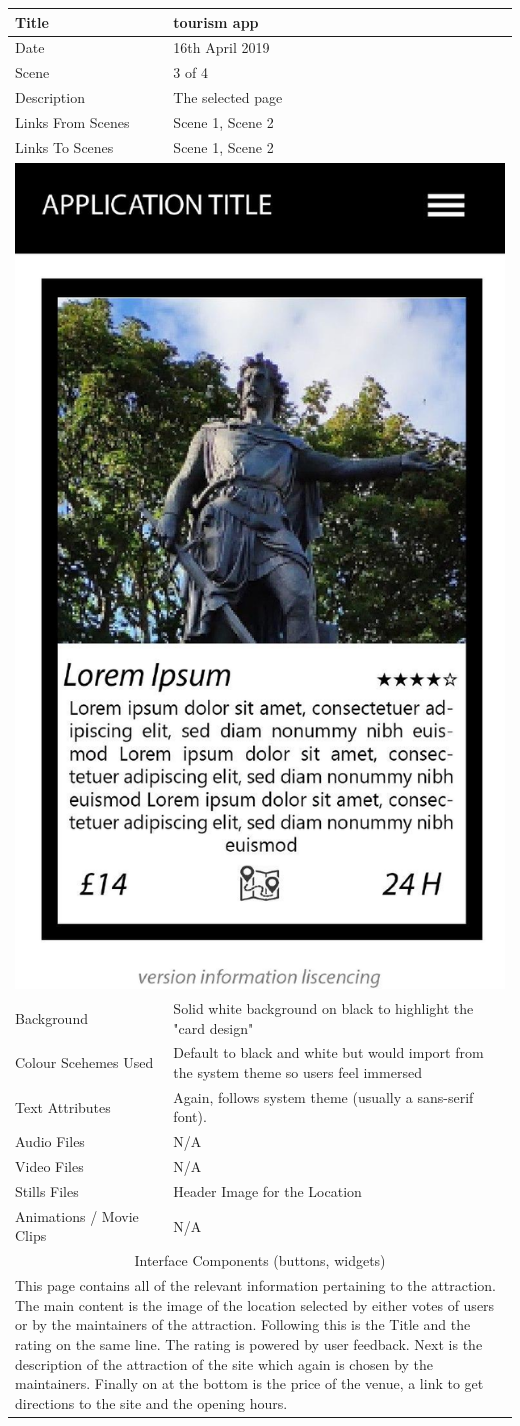 \hspace{-1cm}
	\begin{tabular}{p{4cm}p{10cm}}
		\hline
		Title & tourism app \\
		\hline
		Date & 16th April 2019 \\
		\hline
		Scene & 3 of 4 \\
		\hline
		Description & The selected page \\
		\hline
		Links From Scenes & Scene 1, Scene 2 \\
		\hline
		Links To Scenes & Scene 1, Scene 2 \\
		\hline
		\multicolumn{2}{c}{\includegraphics[width=0.5\linewidth]{images/screen2.jpg}} \\
		\hline
		Background & Solid white background on black to highlight the "card design" \\
		\hline
		Colour Scehemes Used & Default to black and white but would import from the system theme so users feel immersed \\
		\hline
		Text Attributes & Again, follows system theme (usually a sans-serif font). \\
		\hline
		Audio Files & N/A \\
		\hline
		Video Files & N/A \\
		\hline
		Stills Files & Header Image for the Location \\
		\hline
		Animations / Movie Clips & N/A \\
		\hline
		\multicolumn{2}{c}{Interface Components (buttons, widgets)} \\
		\hline
		\multicolumn{2}{p{14cm}}{This page contains all of the relevant information pertaining to the attraction. The main content is the image of the location selected by either votes of users or by the maintainers of the attraction. Following this is the Title and the rating on the same line. The rating is powered by user feedback. Next is the description of the attraction of the site which again is chosen by the maintainers. Finally on at the bottom is the price of the venue, a link to get directions to the site and the opening hours.} \\
		\hline
	\end{tabular}

